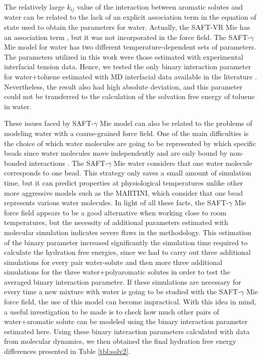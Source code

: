 The relatively large $k_{ij}$ value of the interaction between aromatic solutes and water can be related to the lack of an explicit association term in the equation of state used to obtain the parameters for water. Actually, the SAFT-VR Mie has an association term \cite{lafitte2013}, but it was not incorporated in the force field. The SAFT-$\gamma$ Mie model for water \cite{lobanova2016} has two different temperature-dependent sets of parameters. The parameters utilized in this work were those estimated with experimental interfacial tension data. Hence, we tested the only binary interaction parameter for water+toluene estimated with MD interfacial data available in the literature \cite{herdes2017}. Nevertheless, the result also had high absolute deviation, and this parameter could not be transferred to the calculation of the solvation free energy of toluene in water. 

These issues faced by SAFT-$\gamma$ Mie model can also be related to the problems of modeling water with a coarse-grained force field. One of the main difficulties is the choice of which water molecules are going to be represented by which specific beads since water molecules move independently and are only bound by non-bonded interactions \cite{hadley2010,hadley2012}. The  SAFT-$\gamma$ Mie water considers that one water molecule corresponds to one bead. This strategy only saves a small amount of simulation time, but it can predict properties at physiological temperatures unlike other more aggressive models such as the MARTINI, which consider that one bead represents various water molecules. In light of all these facts, the SAFT-$\gamma$ Mie force field appears to be a good alternative when working close to room temperatures, but the necessity of additional parameters estimated with molecular simulation indicates severe flaws in the methodology. This estimation of the binary parameter increased significantly the simulation time required to calculate the hydration free energies, since we had to carry out three additional simulations for every pair water-solute and then more three additional simulations for the three water+polyaromatic solutes in order to test the averaged binary interaction parameter. If these simulations are necessary for every time a new mixture with water is going to be studied with the SAFT-$\gamma$ Mie force field, the use of this model can become impractical.  With this idea in mind, a useful investigation to be made is to check how much other pairs of water+aromatic solute can be modeled using the binary interaction parameter estimated here. Using these binary interaction parameters calculated with data from molecular dynamics, we then obtained the final hydration free energy differences presented in Table \ref{tbl:solv2}. 

